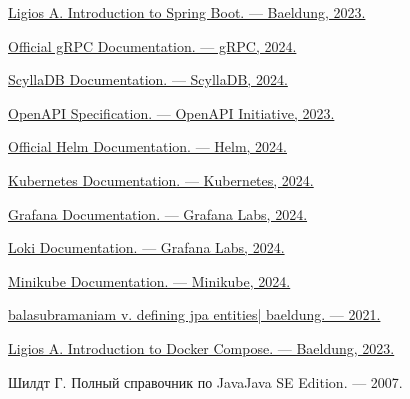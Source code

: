 \documentclass[a4paper,14pt]{extarticle}
\begin{document}
\begin{thebibliography}{0}
    \hypertarget{spring baeldung}{}
    \href{https://www.baeldung.com/spring-boot}
    {Ligios A\@. Introduction to Spring Boot. --- Baeldung, 2023.}

    \hypertarget{grpc official}{}
    \href{https://grpc.io/docs/}
    {Official gRPC Documentation. --- gRPC, 2024.}

    \hypertarget{scylladb}{}
    \href{https://www.scylladb.com/}
    {ScyllaDB Documentation. --- ScyllaDB, 2024.}

    \hypertarget{openapi}{}
    \href{https://www.openapis.org/}
    {OpenAPI Specification. --- OpenAPI Initiative, 2023.}

    \hypertarget{helm}{}
    \href{https://helm.sh/docs/}
    {Official Helm Documentation. --- Helm, 2024.}

    \hypertarget{kubernetes}{}
    \href{https://kubernetes.io/docs/}
    {Kubernetes Documentation. --- Kubernetes, 2024.}

    \hypertarget{grafana}{}
    \href{https://grafana.com/docs/}
    {Grafana Documentation. --- Grafana Labs, 2024.}

    \hypertarget{loki}{}
    \href{https://grafana.com/docs/loki/latest/}
    {Loki Documentation. --- Grafana Labs, 2024.}

    \hypertarget{minikube}{}
    \href{https://minikube.sigs.k8s.io/docs/}
    {Minikube Documentation. --- Minikube, 2024.}

    \hypertarget{jpa baeldung}{}
    \href{https://www.baeldung.com/jpa-entities}
    {balasubramaniam v\@. defining jpa entities| baeldung. --- 2021.}

    \hypertarget{docker baeldung}{}
    \href{https://www.baeldung.com/ops/docker-compose}
    {Ligios A\@. Introduction to Docker Compose. --- Baeldung, 2023.}

     \hypertarget{shild}
    {Шилдт Г. Полный справочник по Java\texttrademark Java SE Edition. --- 2007.}
\end{thebibliography}
\end{document}
